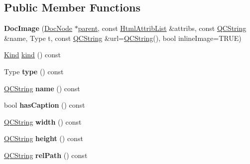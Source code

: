 \subsection*{Public Member Functions}
\begin{DoxyCompactItemize}
\item 
\mbox{\label{class_doc_image_ab5fb5d2b3d9defec16f33b8303e7e72a}} 
{\bfseries Doc\+Image} (\mbox{\hyperlink{class_doc_node}{Doc\+Node}} $\ast$\mbox{\hyperlink{class_doc_node_a73e8ad29a91cfceb0968eb00db71a23d}{parent}}, const \mbox{\hyperlink{class_html_attrib_list}{Html\+Attrib\+List}} \&attribs, const \mbox{\hyperlink{class_q_c_string}{Q\+C\+String}} \&name, Type t, const \mbox{\hyperlink{class_q_c_string}{Q\+C\+String}} \&url=\mbox{\hyperlink{class_q_c_string}{Q\+C\+String}}(), bool inline\+Image=T\+R\+UE)
\item 
\mbox{\hyperlink{class_doc_node_aebd16e89ca590d84cbd40543ea5faadb}{Kind}} \mbox{\hyperlink{class_doc_image_ad4716e09dfb45878f06d20e07d1ccf32}{kind}} () const
\item 
\mbox{\label{class_doc_image_a4a7abc635cfbbb0824b1a482b6cb42e9}} 
Type {\bfseries type} () const
\item 
\mbox{\label{class_doc_image_a0c62b3e12569fac905243b891a62d81a}} 
\mbox{\hyperlink{class_q_c_string}{Q\+C\+String}} {\bfseries name} () const
\item 
\mbox{\label{class_doc_image_af627e9312a4cc758736ebaff6619990e}} 
bool {\bfseries has\+Caption} () const
\item 
\mbox{\label{class_doc_image_a79d36f165096668a3d6631efb6e0b4f0}} 
\mbox{\hyperlink{class_q_c_string}{Q\+C\+String}} {\bfseries width} () const
\item 
\mbox{\label{class_doc_image_a434782653279e9f1d823656d48fe3e26}} 
\mbox{\hyperlink{class_q_c_string}{Q\+C\+String}} {\bfseries height} () const
\item 
\mbox{\label{class_doc_image_a07a0f3e6897e73d26b36ad4430b885e5}} 
\mbox{\hyperlink{class_q_c_string}{Q\+C\+String}} {\bfseries rel\+Path} () const
\item 
\mbox{\label{class_doc_image_a0e32f1e888da6279104a2fb515c620de}} 

\end{DoxyCompactItemize}
